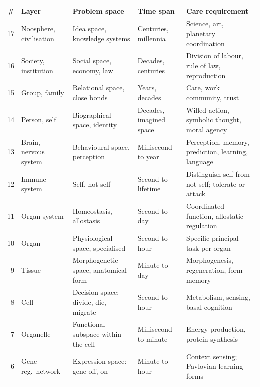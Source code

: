 \thispagestyle{empty}
\vspace*{-16mm}
\noindent
\begin{widebody}
\footnotesize
\setlength{\tabcolsep}{3.5pt}
\renewcommand{\arraystretch}{1.55}
\begin{tabular*}{\linewidth}{@{\extracolsep{\fill}}rp{19mm}p{23mm}p{17mm}p{27mm}@{}}
\toprule
\textbf{\#} & \textbf{Layer} & \textbf{Problem space} & \textbf{Time span} & \textbf{Care requirement} \\
\midrule
\rowcolor{violet!10}17 & Noosphere, civilisation & Idea space, knowledge systems & Centuries, millennia & Science, art, planetary coordination \\
\rowcolor{violet!10}16 & Society, institution & Social space, economy, law & Decades, centuries & Division of labour, rule of law, reproduction \\
\rowcolor{violet!10}15 & Group, family & Relational space, close bonds & Years, decades & Care, work community, trust \\
\midrule[0.1pt]
\rowcolor{yellow!20}14 & Person, self & Biographical space, identity & Decades, imagined space & Willed action, symbolic thought, moral agency \\
\rowcolor{yellow!20}13 & Brain, nervous system & Behavioural space, perception & Millisecond to year & Perception, memory, prediction, learning, language \\
\midrule[0.1pt]
\rowcolor{red!14}12 & Immune system & Self, not-self & Second to lifetime & Distinguish self from not-self; tolerate or attack \\
\midrule[0.1pt]
\rowcolor{green!9}11 & Organ system & Homeostasis, allostasis & Second to day & Coordinated function, allostatic regulation \\
\rowcolor{green!9}10 & Organ & Physiological space, specialised & Second to hour & Specific principal task per organ \\
\rowcolor{green!9}9 & Tissue & Morphogenetic space, anatomical form & Minute to day & Morphogenesis, regeneration, form memory \\
\midrule[0.1pt]
\rowcolor{green!18}8 & Cell & Decision space: divide, die, migrate & Second to hour & Metabolism, sensing, basal cognition \\
\rowcolor{green!18}7 & Organelle & Functional subspace within the cell & Millisecond to minute & Energy production, protein synthesis \\
\rowcolor{green!18}6 & Gene reg.\ network & Expression space: gene off, on & Minute to hour & Context sensing; Pavlovian learning forms \\

\end{tabular*}
\end{widebody}
